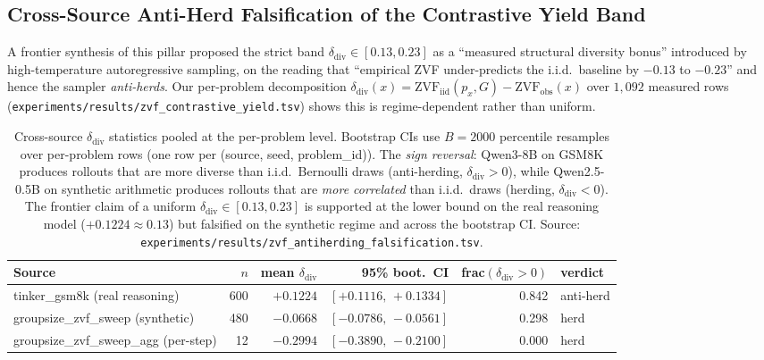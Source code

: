 \subsection{Cross-Source Anti-Herd Falsification of the Contrastive Yield Band}
\label{sec:zvf-cross-source-falsification}

A frontier synthesis of this pillar proposed
the strict band $\delta_{\mathrm{div}} \in [0.13, 0.23]$ as a
``measured structural diversity bonus'' introduced by high-temperature
autoregressive sampling, on the reading that ``empirical ZVF
under-predicts the i.i.d.\ baseline by $-0.13$ to $-0.23$'' and hence
the sampler \emph{anti-herds}. Our per-problem decomposition
$\delta_{\mathrm{div}}(x) = \mathrm{ZVF}_{\mathrm{iid}}(p_x, G) -
\mathrm{ZVF}_{\mathrm{obs}}(x)$ over $1{,}092$ measured rows
(\texttt{experiments/results/zvf\_contrastive\_yield.tsv}) shows this
is regime-dependent rather than uniform.

\begin{table}[ht]
\centering
\small
\begin{tabular}{lrrrrl}
\toprule
Source & $n$ & mean $\delta_{\mathrm{div}}$ & 95\% boot.\ CI & frac$(\delta_{\mathrm{div}} > 0)$ & verdict \\
\midrule
tinker\_gsm8k (real reasoning)        & 600 & $+0.1224$ & $[+0.1116,\,+0.1334]$ & 0.842 & anti-herd \\
groupsize\_zvf\_sweep (synthetic)     & 480 & $-0.0668$ & $[-0.0786,\,-0.0561]$ & 0.298 & herd \\
groupsize\_zvf\_sweep\_agg (per-step) &  12 & $-0.2994$ & $[-0.3890,\,-0.2100]$ & 0.000 & herd \\
\bottomrule
\end{tabular}
\caption{Cross-source $\delta_{\mathrm{div}}$ statistics pooled at the
per-problem level. Bootstrap CIs use $B{=}2000$ percentile resamples
over per-problem rows (one row per (source, seed, problem\_id)). The
\emph{sign reversal}: Qwen3-8B on GSM8K produces rollouts that are
more diverse than i.i.d.\ Bernoulli draws (anti-herding, $\delta_{\mathrm{div}} > 0$),
while Qwen2.5-0.5B on synthetic arithmetic produces rollouts that
are \emph{more correlated} than i.i.d.\ draws (herding, $\delta_{\mathrm{div}} < 0$).
The frontier claim of a uniform $\delta_{\mathrm{div}} \in [0.13, 0.23]$
is supported at the lower bound on the real reasoning model
($+0.1224 \approx 0.13$) but falsified on the synthetic regime and
across the bootstrap CI.
Source: \texttt{experiments/results/zvf\_antiherding\_falsification.tsv}.
}
\label{tab:zvf-falsification}
\end{table}

